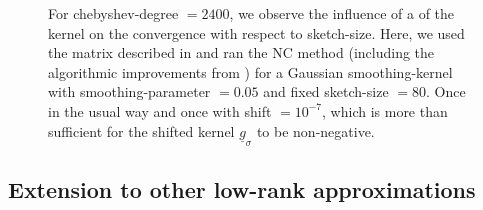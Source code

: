 \begin{figure}[ht]
    \centering
    
    \caption{For \gls{chebyshev-degree} $=2400$, we observe the influence of a
         of the kernel on the convergence with respect to \gls{sketch-size}.
        Here, we used the matrix described in 
        and ran the \gls{NC} method (including the algorithmic improvements
        from ) for a Gaussian \gls{smoothing-kernel} with \gls{smoothing-parameter} $=0.05$
        and fixed \gls{sketch-size} $=80$. Once in the usual way and once with \gls{shift} $=10^{-7}$,
        which is more than sufficient for the shifted kernel $\underline{g}_{\sigma}$ to be non-negative.}
    \label{fig:3-nystrom-shift}
\end{figure}



\subsection{Extension to other low-rank approximations}
\label{subsec:3-nystrom-other-low-rank}

